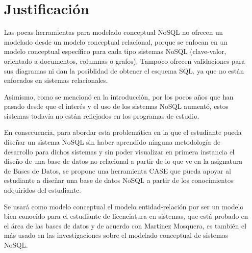 \section{Justificación}

Las pocas herramientas para modelado conceptual NoSQL no ofrecen un modelado desde un modelo conceptual relacional, porque se enfocan en un modelo conceptual específico para cada tipo sistemas NoSQL (clave-valor, orientado a documentos, columnas o grafos). Tampoco ofrecen validaciones para sus diagramas ni dan la posiblidad de obtener el esquema SQL, ya que no están enfocados en sistemas relacionales.


Asimismo, como se mencionó en la introducción, por los pocos años que han pasado desde que el interés y el uso de los sistemas NoSQL aumentó, estos sistemas todavía no están reflejados en los programas de estudio.


En consecuencia, para abordar esta problemática en la que el estudiante pueda diseñar un sistema NoSQL sin haber aprendido ninguna metodología de desarrollo para dichos sistemas y sin poder visualizar en primera instancia el diseño de una base de datos no relacional a partir de lo que ve en la asignatura de Bases de Datos, se propone una herramienta CASE que pueda apoyar al estudiante a diseñar una base de datos NoSQL a partir de los conocimientos adquiridos del estudiante.


Se usará como modelo conceptual el modelo entidad-relación por ser un modelo bien conocido para el estudiante de licenciatura en sistemas, que está probado en el área de las bases de datos y de acuerdo con Martinez Mosquera\cite{martinez-mosquera_modeling_2020}, es también el más usado en las investigaciones sobre el modelado conceptual de sistemas NoSQL.



